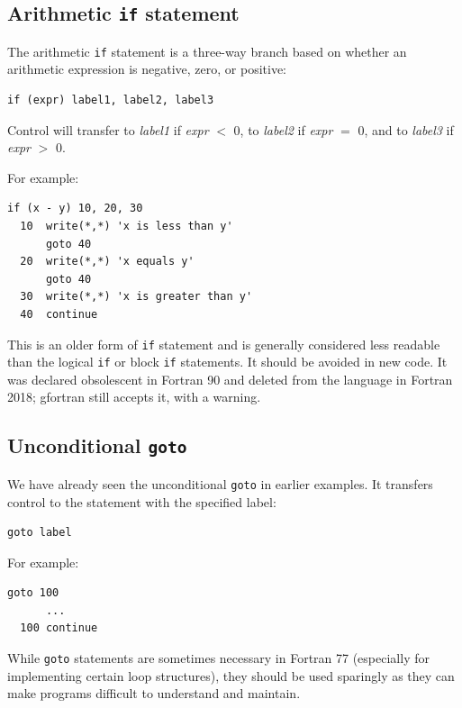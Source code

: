 \subsection{Arithmetic \texttt{if} statement}

The arithmetic \texttt{if} statement is a three-way branch based on whether an arithmetic expression is negative, zero, or positive:

\begin{lstlisting}[style=fortran77]
      if (expr) label1, label2, label3
\end{lstlisting}

Control will transfer to \emph{label1} if \emph{expr} $<$ 0, to \emph{label2} if \emph{expr} $=$ 0, and to \emph{label3} if \emph{expr} $>$ 0.

For example:

\begin{lstlisting}[style=fortran77]
      if (x - y) 10, 20, 30
  10  write(*,*) 'x is less than y'
      goto 40
  20  write(*,*) 'x equals y'
      goto 40
  30  write(*,*) 'x is greater than y'
  40  continue
\end{lstlisting}

This is an older form of \texttt{if} statement and is generally considered less readable than the logical \texttt{if} or block \texttt{if} statements. It should be avoided in new code. It was declared obsolescent in Fortran 90 and deleted from the language in Fortran 2018; gfortran still accepts it, with a warning.

\subsection{Unconditional \texttt{goto}}

We have already seen the unconditional \texttt{goto} in earlier examples. It transfers control to the statement with the specified label:

\begin{lstlisting}[style=fortran77]
      goto label
\end{lstlisting}

For example:

\begin{lstlisting}[style=fortran77]
      goto 100
      ...
  100 continue
\end{lstlisting}

While \texttt{goto} statements are sometimes necessary in Fortran 77 (especially for implementing certain loop structures), they should be used sparingly as they can make programs difficult to understand and maintain.

